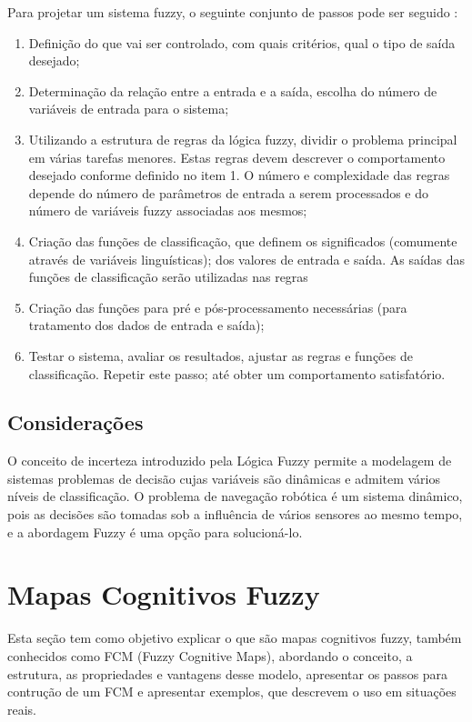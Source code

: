 Para projetar um sistema fuzzy, o seguinte conjunto de passos pode ser seguido \cite{FUZZYLOGICTUTORIAL}:

\begin{enumerate}
    \item Definição do que vai ser controlado, com quais critérios, qual o tipo de saída desejado;
    \item Determinação da relação entre a entrada e a saída, escolha do número de variáveis de entrada para o sistema;
    \item Utilizando a estrutura de regras da lógica fuzzy, dividir o problema principal em várias tarefas menores. Estas
    regras devem descrever o comportamento desejado conforme definido no item 1. O número e complexidade das regras depende do número de parâmetros de entrada a serem processados e do número de variáveis fuzzy associadas aos mesmos;
    \item Criação das funções de classificação, que definem os significados (comumente através de variáveis linguísticas);
    dos valores de entrada e saída. As saídas das funções de classificação serão utilizadas nas regras
    \item Criação das funções para pré e pós-processamento necessárias (para tratamento dos dados de entrada e saída);
    \item Testar o sistema, avaliar os resultados, ajustar as regras e funções de classificação. Repetir este passo;
    até obter um comportamento satisfatório.
\end{enumerate}

\subsection{Considerações}

O conceito de incerteza introduzido pela Lógica Fuzzy permite a modelagem de sistemas problemas de decisão cujas variáveis são dinâmicas e admitem vários níveis de classificação. O problema de navegação robótica
é um sistema dinâmico, pois as decisões são tomadas sob a influência de vários sensores ao mesmo tempo, e a abordagem Fuzzy é uma opção para solucioná-lo.

\section{Mapas Cognitivos Fuzzy}

Esta seção tem como objetivo explicar o que são mapas cognitivos fuzzy, também conhecidos como FCM (Fuzzy Cognitive Maps), abordando o conceito, a estrutura, as propriedades e vantagens desse modelo, apresentar os passos para contrução de um FCM e apresentar exemplos, que descrevem o uso em situações reais.

